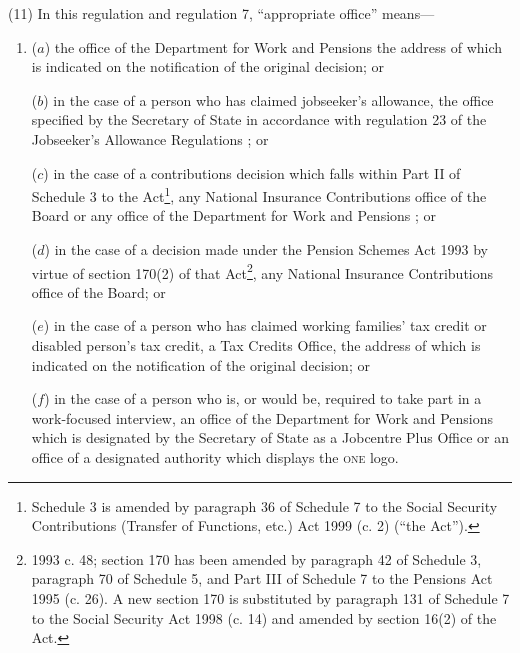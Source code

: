 \documentclass[12pt,a4paper]{article}
\begin{document}
(11) In this regulation and regulation 7, “appropriate office” means---
\begin{enumerate}\item[]
($a$) the office of the 
Department for Work and Pensions  %
the address of which is indicated on the notification of the original decision; or

($b$) in the case of a person who has claimed jobseeker’s allowance, the office specified by the Secretary of State in accordance with regulation 23 of the Jobseeker’s Allowance Regulations%
; or

    ($c$) 
    in the case of a contributions decision which falls within Part II of Schedule 3 to the Act\footnote{\frenchspacing Schedule 3 is amended by paragraph 36 of Schedule 7 to the Social Security Contributions (Transfer of Functions, etc.) Act 1999 (c. 2) (“the Act”).}, any National Insurance Contributions office of the Board or any office of the 
Department for Work and Pensions%
; or

    ($d$) 
    in the case of a decision made under the Pension Schemes Act 1993 by virtue of section 170(2) of that Act\footnote{1993 c. 48; section 170 has been amended by paragraph 42 of Schedule 3, paragraph 70 of Schedule 5, and Part III of Schedule 7 to the Pensions Act 1995 (c. 26). A new section 170 is substituted by paragraph 131 of Schedule 7 to the Social Security Act 1998 (c. 14) and amended by section 16(2) of the Act.}, any National Insurance Contributions office of the Board;
or

($e$) in the case of a person who has claimed working families' tax credit or disabled person’s tax credit, a Tax Credits Office, the address of which is indicated on the notification of the original decision;
or


($f$) in the case of a person who is, or would be, required to take part in a work-focused interview, an office of the Department for Work and Pensions which is designated by the Secretary of State as a Jobcentre Plus Office or an office of a designated authority which displays the \textsc{\lowercase{ONE}} logo.
\end{enumerate}
\end{document}
